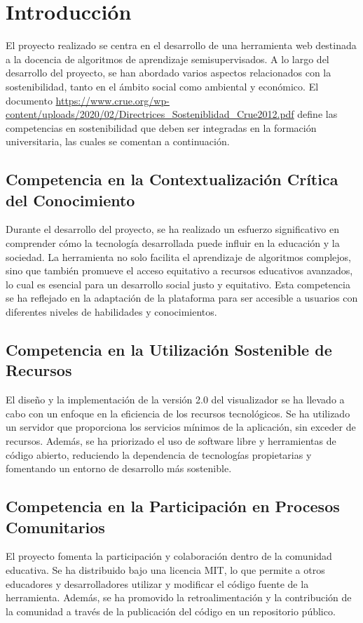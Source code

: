 
\section{Introducción}
El proyecto realizado se centra en el desarrollo de una herramienta web destinada a la docencia de algoritmos de aprendizaje semisupervisados. A lo largo del desarrollo del proyecto, se han abordado varios aspectos relacionados con la sostenibilidad, tanto en el ámbito social como ambiental y económico.
El documento \url{https://www.crue.org/wp-content/uploads/2020/02/Directrices_Sosteniblidad_Crue2012.pdf} define las competencias en sostenibilidad que deben ser integradas en la formación universitaria, las cuales se comentan a continuación.

\subsection{Competencia en la Contextualización Crítica del Conocimiento}
Durante el desarrollo del proyecto, se ha realizado un esfuerzo significativo en comprender cómo la tecnología desarrollada puede influir en la educación y la sociedad. La herramienta no solo facilita el aprendizaje de algoritmos complejos, sino que también promueve el acceso equitativo a recursos educativos avanzados, lo cual es esencial para un desarrollo social justo y equitativo. Esta competencia se ha reflejado en la adaptación de la plataforma para ser accesible a usuarios con diferentes niveles de habilidades y conocimientos.

\subsection{Competencia en la Utilización Sostenible de Recursos}
El diseño y la implementación de la versión 2.0 del visualizador se ha llevado a cabo con un enfoque en la eficiencia de los recursos tecnológicos. Se ha utilizado un servidor que proporciona los servicios mínimos de la aplicación, sin exceder de recursos. Además, se ha priorizado el uso de software libre y herramientas de código abierto, reduciendo la dependencia de tecnologías propietarias y fomentando un entorno de desarrollo más sostenible.

\subsection{Competencia en la Participación en Procesos Comunitarios}
El proyecto fomenta la participación y colaboración dentro de la comunidad educativa. Se ha distribuido bajo una licencia MIT, lo que permite a otros educadores y desarrolladores utilizar y modificar el código fuente de la herramienta. Además, se ha promovido la retroalimentación y la contribución de la comunidad a través de la publicación del código en un repositorio público.

